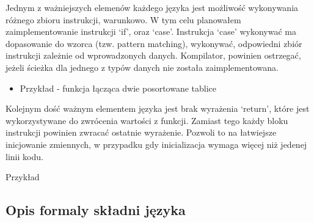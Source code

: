 \documentclass{article}
\begin{document}

\newpage



Jednym z ważniejszych elemenów każdego języka jest możliwość wykonywania różnego zbioru instrukcji, warunkowo. W tym celu planowałem zaimplementowanie instrukcji `if', oraz `case'. Instrukcja `case' wykonywać ma dopasowanie do wzorca (tzw. pattern matching), wykonywać, odpowiedni zbiór instrukcji zależnie od wprowadzonych danych. Kompilator, powinien ostrzegać, jeżeli ścieżka dla jednego z typów danych nie została zaimplementowana.

\begin{itemize}

  \item Przykład - funkcja łącząca dwie posortowane tablice
        \newpage
        
\end{itemize}


Kolejnym dość ważnym elementem języka jest brak wyrażenia `return', które jest wykorzystywane do zwrócenia wartości z funkcji. Zamiast tego każdy bloku instrukcji powinien zwracać ostatnie wyrażenie. Pozwoli to na łatwiejsze inicjowanie zmiennych, w przypadku gdy inicializacja wymaga więcej niż jedenej linii kodu.

\newpage
Przykład



\newpage
\subsection{Opis formaly składni języka}
\end{document}
